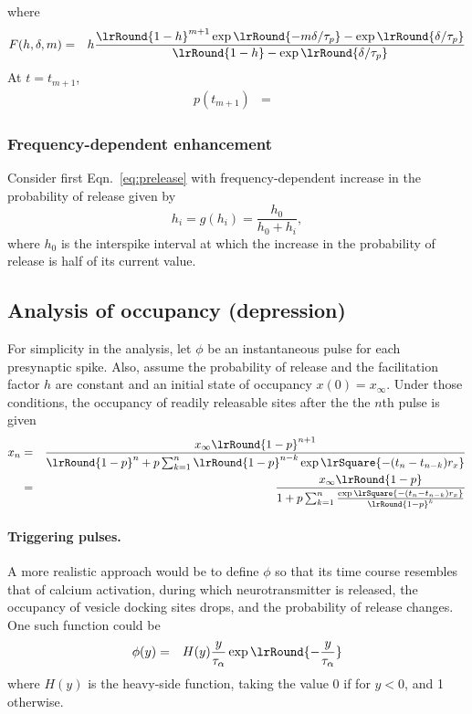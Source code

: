 \documentclass[11pt,landscape]{article}
\begin{document}
where 
\begin{eqnarray}
F(h,\delta, m) 
&=& 
h 
\frac
{ \lrRound{1- h}^{m+1}
\exp \lrRound{- m \delta / \tau_p}
- {\exp \lrRound{  \delta / \tau_p}}
}
{\lrRound{1- h} - \exp \lrRound{ \delta / \tau_p}}
\end{eqnarray}
At $t=t_{m+1}$, 
\begin{eqnarray}
p(t_{m+1})
&=&
\end{eqnarray}

\subsubsection{Frequency-dependent enhancement}
Consider first Eqn.~\eqref{eq:prelease} with frequency-dependent
increase in the probability of release given by 
\begin{equation}
h_i =g(h_i) =\frac{h_0}{h_0 + h_i}, 
\label{eq:epsilon}
\end{equation}
where $h_0$ is the interspike interval at which the increase in the probability
of release is half of its current value. 


\subsection{Analysis of occupancy (depression)}

For simplicity in the analysis, let $\phi$ be an instantaneous pulse
for each presynaptic spike. Also, assume the probability of release
and the facilitation factor $h$ are constant and an initial state of
occupancy $x(0)=x_{\infty}$. 
Under those conditions, the occupancy of readily
releasable sites after the the $n$th pulse is given 
\begin{eqnarray}
x_n
&=& 
\frac{
x_{\infty} \lrRound{1-p}^{n+1} 
}
{
\lrRound{1-p}^{n} 
+ p
\sum_{k=1}^{n} \lrRound{1-p}^{n-k} \exp\lrSquare{- (t_n-t_{n-k}) r_x }
}
\label{tnOccup1}
\\
&=& 
\frac{
x_{\infty} \lrRound{1-p}
}{
1
+ p
\sum_{k=1}^{n} \frac{ \exp\lrSquare{- (t_n-t_{n-k}) r_x }}{\lrRound{1-p}^{k}}
}
\label{tnOccup2}
\end{eqnarray}

\paragraph{Triggering pulses.}
A more realistic approach would be to define $\phi$
so that its time course resembles that of calcium activation, during
which neurotransmitter is released, the occupancy  of vesicle docking sites drops, and
the probability of release changes. 
One such function could be
\begin{eqnarray}
\phi(y) &=& H(y)  \frac{y}{\tau_{\alpha}} \exp \lrRound{-\frac{y}{\tau_{\alpha}}}
\label{eq:alpha}
\end{eqnarray}
where $H(y)$ is the heavy-side function, taking the value 0 if for
$y<0$, and 1 otherwise. 
\end{document}
